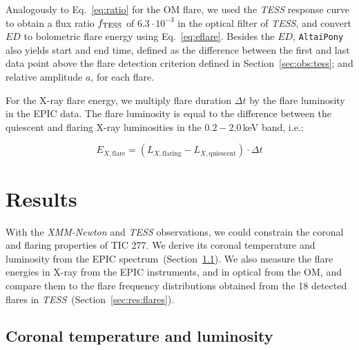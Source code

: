 \documentclass[twocolumn]{aastex631}
\begin{document}
Analogously to Eq.~\ref{eq:ratio} for the OM flare, we used the \textit{TESS} response curve to obtain a flux ratio $f_{\rm TESS}$ of $6.3\cdot10^{-3}$ in the optical filter of \textit{TESS}, and convert $ED$ to bolometric flare energy using Eq.~\ref{eq:eflare}. Besides the $ED$, \texttt{AltaiPony} also yields start and end time, defined as the difference between the first and last data point above the flare detection criterion defined in Section~\ref{sec:obs:tess}; and relative amplitude $a$, for each flare.

For the X-ray flare energy, we multiply flare duration $\Delta t$ by the flare luminosity in the EPIC data. The flare luminosity is equal to the difference between the quiescent and flaring X-ray luminosities in the $0.2-2.0\,$keV band, i.e.:

\begin{equation}
    E_{X, \mathrm{flare}} = \left(L_{X,\mathrm{flaring}} -  L_{X,\mathrm{quiescent}}\right) \cdot \Delta t
    \label{eq:xrayflare}
\end{equation}

\section{Results}
\label{sec:results}
With the \textit{XMM-Newton} and \textit{TESS} observations, we could constrain the coronal and flaring properties of TIC 277. We derive its coronal temperature and luminosity from the EPIC spectrum~(Section~\ref{sec:res:XrayTL}). We also measure the flare energies in X-ray from the EPIC instruments, and in optical from the OM, and compare them to the flare frequency distributions obtained from the 18 detected flares in \textit{TESS}~(Section~\ref{sec:res:flares}).


\subsection{Coronal temperature and luminosity}
\label{sec:res:XrayTL}
\end{document}
